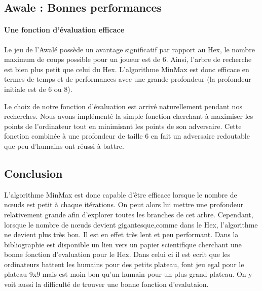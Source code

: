 


\subsection{Awale : Bonnes performances}
\paragraph{Une fonction d'évaluation efficace} Le jeu de l'Awalé possède un avantage significatif par rapport au Hex, le nombre maximum de coups 
possible pour un joueur est de 6. Ainsi, l'arbre de recherche est bien plus petit que celui du Hex. L'algorithme MinMax est donc efficace en termes de 
temps et de performances avec une grande profondeur (la profondeur initiale est de 6 ou 8). 

Le choix de notre fonction d'évaluation est arrivé naturellement pendant nos recherches. Nous avons implémenté la simple fonction cherchant à
maximiser les points de l'ordinateur tout en minimisant les points de son adversaire. Cette fonction combinée à une profondeur de taille 6 en fait un 
adversaire redoutable que peu d'humains ont réussi à battre.

\subsection{Conclusion}
L'algorithme MinMax est donc capable d'être efficace lorsque le nombre de nœuds est petit à chaque itérations. On peut alors 
lui mettre une profondeur relativement grande afin d'explorer toutes les branches de cet arbre. 
Cependant, lorsque le nombre de nœuds devient gigantesque,comme dans le Hex, l'algorithme ne devient plus très bon. Il est en effet très lent et peu performant.
Dans la bibliographie est disponible un lien vers un papier scientifique cherchant une bonne fonction d'evaluation pour le Hex.
Dans celui ci il est ecrit que les ordinateurs battent les humains pour des petits plateau, font jeu egal pour le plateau 9x9 mais
est moin bon qu'un humain pour un plus grand plateau. On y voit aussi la difficulté de trouver une bonne fonction d'evalutaion.
